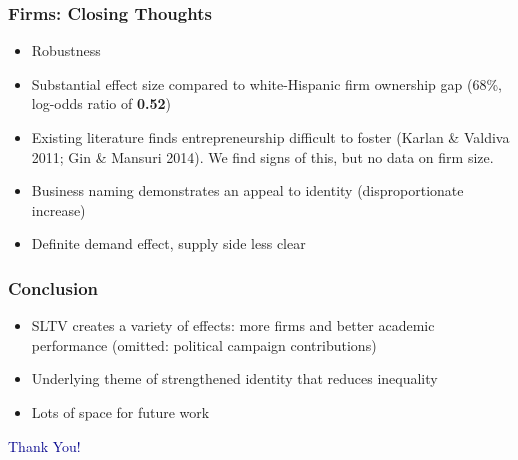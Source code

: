 \documentclass{beamer}
\begin{document}
\begin{frame}
\frametitle{Firms: Closing Thoughts}
\label{firm_close}
\begin{itemize}
\item Robustness \hyperlink{firm_spatial}{}  \hyperlink{firm_dist}{}   \hyperlink{firm_controls}{} 
\item Substantial effect size compared to white-Hispanic firm ownership gap (68\%, log-odds ratio of \textbf{0.52}) 
\item Existing literature finds entrepreneurship difficult to foster {\footnotesize (Karlan \& Valdiva 2011; Gin \& Mansuri 2014)}. We find signs of this, but no data on firm size. \\
\item Business naming demonstrates an appeal to identity (disproportionate increase) \\
\item Definite demand effect, supply side less clear
\end{itemize}
\end{frame}



\begin{frame}
\frametitle{Conclusion}
\begin{itemize}
\item SLTV creates a variety of effects: more firms and better academic performance (omitted: political campaign contributions)
\item Underlying theme of strengthened identity that reduces inequality
\item Lots of space for future work
\end{itemize}
\end{frame}

		
\begin{frame}
\Large \centering \textcolor{darkblue}{Thank You!}
\end{frame}

\end{document}
